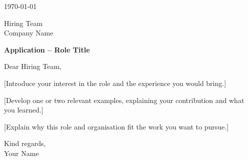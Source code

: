 \documentclass{cv}
\begin{document}
\makecvheader

\raggedright
\setlength{\parskip}{0.75\baselineskip}

\hfill\today\par

Hiring Team\\
Company Name

\textbf{Application -- Role Title}

Dear Hiring Team,

[Introduce your interest in the role and the experience you would bring.]

[Develop one or two relevant examples, explaining your contribution and what you learned.]

[Explain why this role and organisation fit the work you want to pursue.]

Kind regards,\\
Your Name
\end{document}

